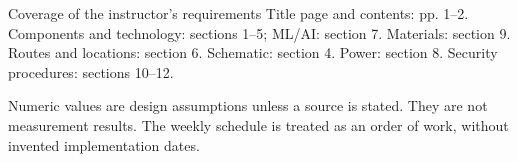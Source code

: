 \tableofcontents
\vfill
\begin{note}{Coverage of the instructor's requirements}
Title page and contents: pp. 1--2. Components and technology: sections 1--5; ML/AI: section 7. Materials: section 9. Routes and locations: section 6. Schematic: section 4. Power: section 8. Security procedures: sections 10--12.
\end{note}
{\small\color{muted}Numeric values are design assumptions unless a source is stated. They are not measurement results. The weekly schedule is treated as an order of work, without invented implementation dates.}

